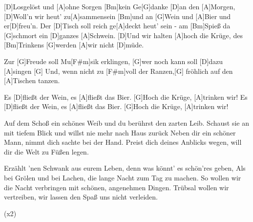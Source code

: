 

\begin{guitar}
	[D]Losgelöst und [A]ohne Sorgen [Bm]kein Ge[G]danke [D]an den [A]Morgen,
	[D]Woll'n wir heut' zu[A]sammensein [Bm]und an [G]Wein und [A]Bier und er[D]freu'n.
	Der [D]Tisch soll reich ge[A]deckt heut' sein - am [Bm]Spieß da [G]schmort ein [D]ganzes [A]Schwein.
	[D]Und wir halten [A]hoch die Krüge, des [Bm]Trinkens [G]werden [A]wir nicht [D]müde.
	
	Zur [G]Freude soll Mu[F#m]sik erklingen, [G]wer noch kann soll [D]dazu [A]singen
	[G] Und, wenn nicht zu [F#m]voll der Ranzen,[G] fröhlich auf den [A]Tischen tanzen.
	
	Es [D]fließt der Wein, es [A]fließt das Bier. [G]Hoch die Krüge, [A]trinken wir!
	Es [D]fließt der Wein, es [A]fließt das Bier. [G]Hoch die Krüge, [A]trinken wir!
	
	Auf dem Schoß ein schönes Weib und du berührst den zarten Leib.
	Schaust sie an mit tiefem Blick und willst nie mehr nach Haus zurück
	Neben dir ein schöner Mann, nimmt dich sachte bei der Hand.
	Preist dich deines Anblicks wegen, will dir die Welt zu Füßen legen.
	
	 
	
	 
	
	Erzählt 'nen Schwank aus eurem Leben, denn was könnt' es schön'res geben,
	Als bei Grölen und bei Lachen, die lange Nacht zum Tag zu machen.
	So wollen wir die Nacht verbringen mit schönen, angenehmen Dingen.
	Trübsal wollen wir vertreiben, wir lassen den Spaß uns nicht verleiden.
	
	 
	
	  (x2)
\end{guitar}




